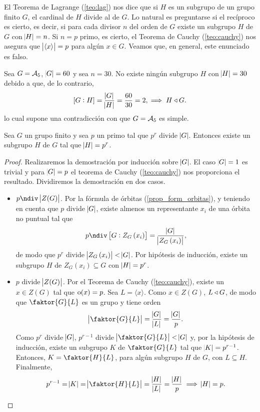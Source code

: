 El Teorema de Lagrange (\ref{teo:lag}) nos dice que si $H$ es un subgrupo de un grupo finito $G$,
el cardinal de $H$ divide al de $G$. Lo natural es preguntarse si el recíproco es cierto, es decir, si
para cada divisor $n$ del orden de $G$ existe un subgrupo $H$ de $G$ con $\abs{H}=n$. Si $n = p$ primo, es cierto,
 el Teorema de Cauchy (\ref{teo:cauchy}) nos asegura que $\abs{\left< x\right>}=p$ para algún $x\in G$.
Veamos que, en general, este enunciado es falso.
\begin{example}
    Sea $G = \mathcal{A}_5$, $\abs{G} = 60$ y sea $n = 30$. No existe ningún subgrupo $H$ con $\abs{H} = 30$ debido a
    que, de lo contrario,
    \[
        \left[ G : H \right] = \frac{\abs{G}}{\abs{H}} = \frac{60}{30} = 2,
        \implies H \triangleleft G.
    \]
    lo cual supone una contradicción con que $G=\mathcal{A}_5$ es simple.
\end{example}

\begin{teo}\label{teo:ptsyl}
    Sea $G$ un grupo finito y sea $p$ un primo tal que $p^r$ divide $\abs{G}$. Entonces existe un subgrupo $H$
    de $G$ tal que $\abs{H} = p^r$.
\end{teo}

\begin{proof}
    Realizaremos la demostración por inducción sobre $\abs{G}$. El caso $\abs{G} = 1$ es trivial y para $\abs{G}=p$
    el teorema de Cauchy (\ref{teo:cauchy}) nos proporciona el resultado.
    Dividiremos la demostración en dos casos.
    \begin{itemize}
        \item $p \ndiv\, \abs{Z(G)}$. Por la fórmula de órbitas (\ref{prop_form_orbitas}), y teniendo en cuenta que $p$ divide $\abs{G}$,
        existe almenos un representante $x_i$ de una órbita no puntual tal que
            \[
                p \ndiv \left[ G : Z_G\left(x_i \right) \right] = \frac{\abs{G}}{\abs{Z_G\left( x_i \right)}},
            \]
            de modo que $p^r$ divide $\abs{Z_G\left( x_i\right)}<\abs{G}$. Por hipótesis de inducción, existe un
            subgrupo $H$ de $Z_G\left( x_i \right)\subseteq G$ con $\abs{H} = p^r$.
        \item $p$ divide $\abs{Z(G)}$. Por el Teorema de Cauchy (\ref{teo:cauchy}), existe un $x\in Z(G)$ tal que
            $\operatorname{o}(x) = p$. Sea $L = \langle x \rangle$. Como $x \in Z(G)$, $L \triangleleft G$, de modo que
            $\faktor{G}{L}$ es un grupo y tiene orden 
            \[
                \abs{\faktor{G}{L}} = \frac{\abs{G}}{\abs{L}} = \frac{\abs{G}}{p}.
            \]
             Como $p^r$ divide $\abs{G}$, $p^{r-1}$ divide $\abs{\faktor{G}{L}} < \abs{G}$ y, por la
        hipótesis de inducción, existe un subgrupo $K$ de $\faktor{G}{L}$ tal que $\abs{K} = p^{r-1}$.
        Entonces, $K = \faktor{H}{L}$, para algún subgrupo $H$ de $G$, con $L \subseteq H$. Finalmente,
        \[
            p^{r-1} = \abs{K} = \abs{\faktor{H}{L}} = \frac{\abs{H}}{\abs{L}} = \frac{\abs{H}}{p}
            \implies \abs{H} = p.
        \]
    \end{itemize}
\end{proof}


